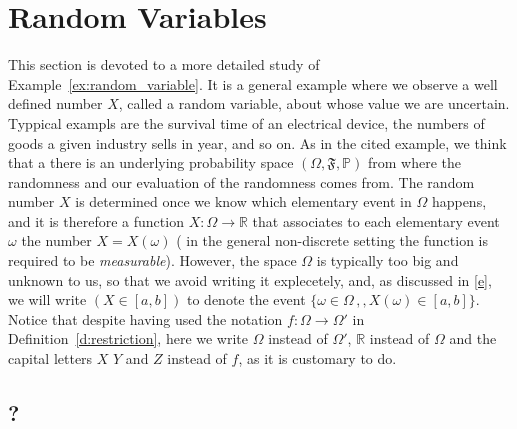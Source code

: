 
\section{Random Variables}

	This section is devoted to a more detailed study of Example~\ref{ex:random_variable}. It is a general example where we observe a well defined number $X$, called a random variable, about whose value we are uncertain. Typpical exampls are the survival time of an electrical device, the numbers of goods a given industry sells in year, and so on. As in the cited example, we think that a there is an underlying probability space $(\Omega, \mathfrak F , \mathbb P)$ from where the randomness and our evaluation of the randomness comes from. The random number $X$ is determined once we know which elementary event in $\Omega$ happens, and it is therefore a function $X:\Omega \to \mathbb R$ that associates to each elementary event $\omega$ the number $ X = X(\omega)$ ( in  the general non-discrete setting the function is required to be \emph{measurable}). However, the space $\Omega$ is typically too big and unknown to us, so that we avoid writing it explecetely, and, as discussed in \eqref{e}, we will write $(X \in [a,b])$ to denote the event $\{\omega \in \Omega \,, , X(\omega) \in [a,b]\}$.  Notice that despite having used the notation $f: \Omega \to \Omega'$ in Definition~\ref{d:restriction}, here we write $\Omega$ instead of $\Omega'$, $\mathbb R$ instead of $\Omega$ and the capital letters $X$ $Y$ and $Z$ instead of $f$, as it is customary to do. 

		\subsection{?}
	
